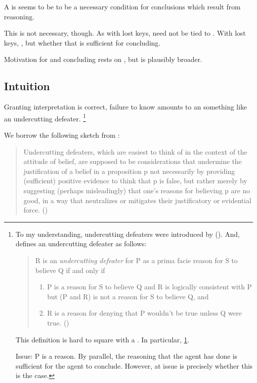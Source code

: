 \begin{note}
  A \requ{} is seems to be to be a necessary condition for conclusions which result from \sR{} reasoning.

  This is not necessary, though.
  As with lost keys, \requ{} need not be tied to \sR{}.
  With lost keys, \sR{}, but whether that is sufficient for concluding.

  Motivation for  and concluding rests on \sR{}, but is plausibly broader.
\end{note}

\subsection{Intuition}
\label{sec:intuition-1}

\begin{note}
  Granting interpretation is correct, failure to know \fc{} amounts to an something like an undercutting defeater.%
  \footnote{
    To my understanding, undercutting defeaters were introduced by \citeauthor{Pollock:1987un} (\citeyear{Pollock:1987un}).
    And, \citeauthor{Pollock:1987un} defines an undercutting defeater as follows:
    \begin{quote}
    R is an \emph{undercutting defeater} for P as a prima facie reason for S to believe Q if and only if
    \begin{enumerate}[label=(UD\arabic*), ref=(UD\arabic*)]
    \item
      \label{pollock:ud:1}
      P is a reason for S to believe Q and R is logically consistent with P but (P and R) is not a reason for S to believe Q, and
    \item
      \label{pollock:ud:2}
      R is a reason for denying that P wouldn't be true unless Q were true.%
      \mbox{}\hfill\mbox{(\citeyear[485]{Pollock:1987un})}
    \end{enumerate}
  \end{quote}
  This definition is hard to square with a \requ{}.
  In particular, \ref{pollock:ud:1}.

  Issue: P is a reason.
  By parallel, the reasoning that the agent has done is sufficient for the agent to conclude.
  However, at issue is precisely whether this is the case.
  }

  We borrow the following sketch from \textcite{Worsnip:2018aa}:
  \begin{quote}
    Undercutting defeaters, which are easiest to think of in the context of the attitude of belief, are supposed to be considerations that undermine the justification of a belief in a proposition p not necessarily by providing (sufficient) positive evidence to think that p is false, but rather merely by suggesting (perhaps misleadingly) that one’s reasons for believing p are no good, in a way that neutralizes or mitigates their justificatory or evidential force.%
    \mbox{}\hfill\mbox{(\citeyear[29]{Worsnip:2018aa})}
  \end{quote}


\end{note}
